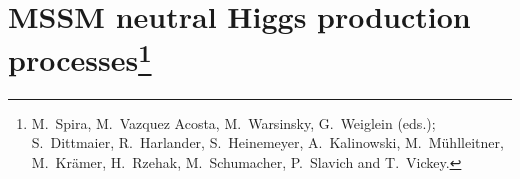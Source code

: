 \section{MSSM neutral Higgs production processes\footnote{M.~Spira,
M.~Vazquez Acosta, M.~Warsinsky, G.~Weiglein (eds.); S.~Dittmaier,
R.~Harlander, S.~Heinemeyer, A.~Kalinowski, M.~M\"uhlleitner,
M.~Kr\"amer, H.~Rzehak, M.~Schumacher, P.~Slavich and T.~Vickey.}}

\label{sec:mssm_neutral}






\providecommand{\PA}{\mathrm{A}}
\newcommand{\orderx}[1]{\ensuremath{{\cal O}(#1)}}
\newcommand{\mhmaxx}{\ensuremath{m_h^{\rm max}}}
\newcommand{\cp}{\mathrm{CP}}
\newcommand{\MHp}{M_{\PSHpm}}
\providecommand{\lsim}
{\;\raisebox{-.3em}{$\stackrel{\displaystyle <}{\sim}$}\;}
\providecommand{\gsim}
{\;\raisebox{-.3em}{$\stackrel{\displaystyle >}{\sim}$}\;}
\providecommand{\gghnnlo}{{\sc ggH@NNLO}}
\providecommand{\bbhnnlo}{{\sc bbH@NNLO}}
\providecommand{\HDECAY}{{\sc HDECAY}}
\providecommand{\HIGLU}{{\sc HIGLU}}
\providecommand{\Prophecy}{{\sc Prophecy4f}}
\providecommand{\CPsuperH}{{\sc CPsuperH}}
\providecommand{\FeynHiggs}{{\sc FeynHiggs}}

